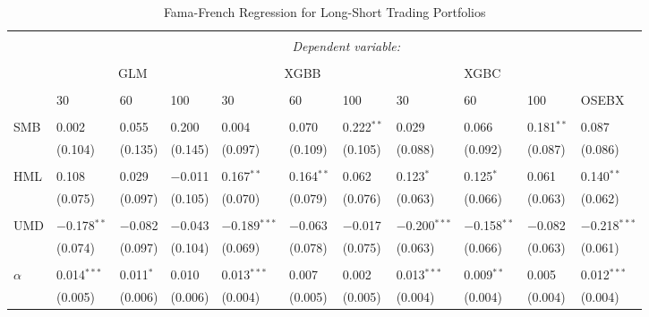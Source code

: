 \begin{table}[H] 
\centering 
  \caption{Fama-French Regression for Long-Short Trading Portfolios} 
  \label{table:FAMA-FRENCH-LONG-SHORT-TRADING-FINAL} 
\begin{tabularx}{\textwidth}{XXXXXXXXXXl} 
\\[-1.8ex]\hline 
\hline \\[-1.8ex] 
 & \multicolumn{10}{c}{\textit{Dependent variable:}} \\ 
\cline{2-11} 
\\[-1.8ex] 
 & \multicolumn{3}{c}{GLM} & \multicolumn{3}{c}{XGBB} & \multicolumn{3}{c}{XGBC} & \\
 \cline{2-11}
 \\[-1.8ex] 
 & 30 & 60 & 100 & 30 & 60 & 100 & 30 & 60 & 100 & OSEBX \\ 
 \cline{2-11} \\
 SMB & 0.002 & 0.055 & 0.200 & 0.004 & 0.070 & 0.222$^{**}$ & 0.029 & 0.066 & 0.181$^{**}$ & 0.087 \\ 
  & (0.104) & (0.135) & (0.145) & (0.097) & (0.109) & (0.105) & (0.088) & (0.092) & (0.087) & (0.086) \\ 
  & & & & & & & & & & \\ 
 HML & 0.108 & 0.029 & $-$0.011 & 0.167$^{**}$ & 0.164$^{**}$ & 0.062 & 0.123$^{*}$ & 0.125$^{*}$ & 0.061 & 0.140$^{**}$ \\ 
  & (0.075) & (0.097) & (0.105) & (0.070) & (0.079) & (0.076) & (0.063) & (0.066) & (0.063) & (0.062) \\ 
  & & & & & & & & & & \\ 
 UMD & $-$0.178$^{**}$ & $-$0.082 & $-$0.043 & $-$0.189$^{***}$ & $-$0.063 & $-$0.017 & $-$0.200$^{***}$ & $-$0.158$^{**}$ & $-$0.082 & $-$0.218$^{***}$ \\ 
  & (0.074) & (0.097) & (0.104) & (0.069) & (0.078) & (0.075) & (0.063) & (0.066) & (0.063) & (0.061) \\ 
  & & & & & & & & & & \\ 
 $\alpha$ & \cellcolor{lightlightgreen}0.014$^{***}$ & 0.011$^{*}$ & 0.010 & \cellcolor{lightlightgreen}0.013$^{***}$ & 0.007 & 0.002 & \cellcolor{lightlightgreen}0.013$^{***}$ & 0.009$^{**}$ & 0.005 & 0.012$^{***}$ \\ 
  & (0.005) & (0.006) & (0.006) & (0.004) & (0.005) & (0.005) & (0.004) & (0.004) & (0.004) & (0.004) \\ 

\end{tabularx}
\end{table}
